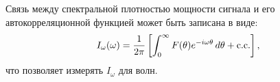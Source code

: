\begin{to_thr}
    Связь между спектральной плотностью мощности сигнала и его автокорреляционной функцией может быть записана в виде:
    \begin{equation*}
    I_\omega (\omega) = \frac{1}{2\pi}\left[
        \int_{0}^{\infty} F(\theta) e^{- i \omega \theta} \, d \theta + \text{c.c.}
    \right],
    \end{equation*}
    что позволяет измерять $I_\omega$ для волн.
\end{to_thr}

